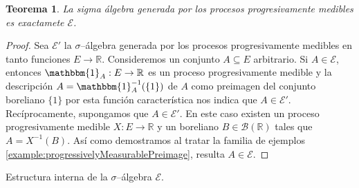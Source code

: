 \documentclass{report}
\newcommand{\characteristic}{\mathbbm{1}}
\newcommand{\borel}{\mathscr{B}}
\newcommand{\progressiveAlgebra}{\mathscr{E}}
\newcommand{\realNumbers}{\mathbb{R}}
\theoremstyle{plain}
\newtheorem{theorem}{Teorema}
\theoremstyle{remark}
\theoremstyle{definition}
\begin{document}
\begin{theorem}
  La sigma álgebra generada por los procesos progresivamente medibles es exactamete \(\progressiveAlgebra\).
\end{theorem}
\begin{proof}
  Sea \(\progressiveAlgebra'\) la \(\sigma\)--álgebra generada por los procesos progresivamente medibles en tanto funciones \(E \rightarrow \realNumbers\).
  Consideremos un conjunto \(A \subseteq E\) arbitrario.
  Si \(A \in \progressiveAlgebra\), entonces \(\characteristic_A : E \rightarrow \realNumbers\) es un proceso progresivamente medible y la descripción \(A = \characteristic_A^{- 1}(\{1\})\) de \(A\) como preimagen del conjunto boreliano \(\{1\}\) por esta función característica nos indica que \(A \in \progressiveAlgebra'\).
  Recíprocamente, supongamos que \(A \in \progressiveAlgebra'\).
  En este caso existen un proceso progresivamente medible \(X : E \rightarrow \realNumbers\) y un boreliano \(B \in \borel(\realNumbers)\) tales que \(A = X^{- 1}(B)\).
  Así como demostramos al tratar la familia de ejemplos \ref{example:progressivelyMeasurablePreimage}, resulta \(A \in \progressiveAlgebra\). 
\end{proof}

Estructura interna de la \(\sigma\)--álgebra \(\progressiveAlgebra\).
\end{document}
